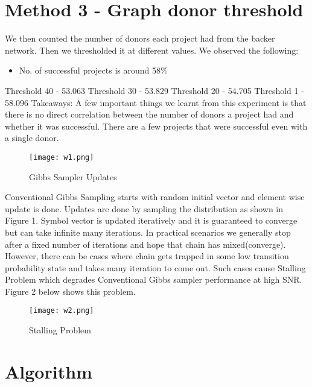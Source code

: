 \documentclass{article}
\begin{document}
\section*{Method 3 - Graph donor threshold}
We then counted the number of donors each project had from the backer network. Then we thresholded it at different values. We observed the following: \\
\begin{itemize}
\item No. of successful projects is around 58\%
\end{itemize}

Threshold 40 - 53.063%
Threshold 30 - 53.829%
Threshold 20 - 54.705%
Threshold 1 - 58.096%
Takeaways:
A few important things we learnt from this experiment is that there is no direct correlation between the number of donors a project had and whether it was successful. 
There are a few projects that were successful even with a single donor. 

\begin{figure}[H]
\centering
\texttt{[image: w1.png]}
\caption{Gibbs Sampler Updates}
\label{fig1:Gibbs Sampler}
\end{figure}

Conventional Gibbs Sampling starts with random initial vector and element wise 
update is done. Updates are done by sampling the distribution as shown in Figure 1.
Symbol vector is updated iteratively and it is guaranteed to converge but can take
infinite many iterations. In practical scenarios we generally stop after a fixed
number of iterations and hope that chain has mixed(converge). However, there can
be cases where chain gets trapped in some low transition probability state and
takes many iteration to come out. Such cases cause Stalling Problem which degrades
Conventional Gibbs sampler performance at high SNR. Figure 2 below shows this problem.

\begin{figure}[H]
\centering
\texttt{[image: w2.png]}
\caption{Stalling Problem}
\label{fig2:Stalling Problem}
\end{figure}

\section*{Algorithm}
\end{document}
